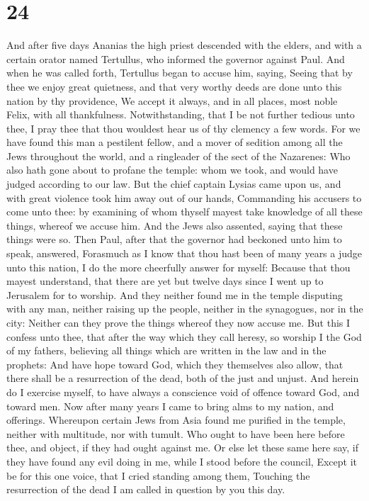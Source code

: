 \hypertarget{section-23}{%
\section{24}\label{section-23}}

 And after five days Ananias the high priest descended
with the elders, and with a certain orator named Tertullus, who informed
the governor against Paul.  And when he was called forth,
Tertullus began to accuse him, saying, Seeing that by thee we enjoy
great quietness, and that very worthy deeds are done unto this nation by
thy providence,  We accept it always, and in all places,
most noble Felix, with all thankfulness.  Notwithstanding,
that I be not further tedious unto thee, I pray thee that thou wouldest
hear us of thy clemency a few words.  For we have found
this man a pestilent fellow, and a mover of sedition among all the Jews
throughout the world, and a ringleader of the sect of the Nazarenes:
 Who also hath gone about to profane the temple: whom we
took, and would have judged according to our law.  But the
chief captain Lysias came upon us, and with great violence took him away
out of our hands,  Commanding his accusers to come unto
thee: by examining of whom thyself mayest take knowledge of all these
things, whereof we accuse him.  And the Jews also
assented, saying that these things were so.  Then Paul,
after that the governor had beckoned unto him to speak, answered,
Forasmuch as I know that thou hast been of many years a judge unto this
nation, I do the more cheerfully answer for myself: 
Because that thou mayest understand, that there are yet but twelve days
since I went up to Jerusalem for to worship.  And they
neither found me in the temple disputing with any man, neither raising
up the people, neither in the synagogues, nor in the city:
 Neither can they prove the things whereof they now
accuse me.  But this I confess unto thee, that after the
way which they call heresy, so worship I the God of my fathers,
believing all things which are written in the law and in the prophets:
 And have hope toward God, which they themselves also
allow, that there shall be a resurrection of the dead, both of the just
and unjust.  And herein do I exercise myself, to have
always a conscience void of offence toward God, and toward men.
 Now after many years I came to bring alms to my nation,
and offerings.  Whereupon certain Jews from Asia found me
purified in the temple, neither with multitude, nor with tumult.
 Who ought to have been here before thee, and object, if
they had ought against me.  Or else let these same here
say, if they have found any evil doing in me, while I stood before the
council,  Except it be for this one voice, that I cried
standing among them, Touching the resurrection of the dead I am called
in question by you this day.

